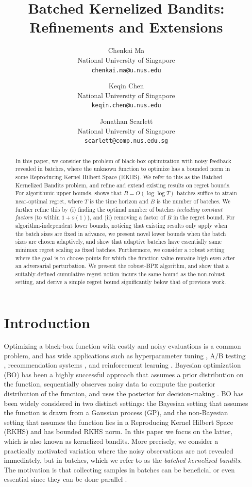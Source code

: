 \documentclass[10pt]{article}
\title{Batched Kernelized Bandits: Refinements and Extensions}
\author{
Chenkai Ma \\
National University of Singapore \\
\texttt{chenkai.ma@u.nus.edu}
\and
Keqin Chen \\
National University of Singapore \\
\texttt{keqin.chen@u.nus.edu}
\and
Jonathan Scarlett \\
National University of Singapore \\
\texttt{scarlett@comp.nus.edu.sg}
}
\date{}
\begin{document}
\maketitle

\begin{abstract}
    In this paper, we consider the problem of black-box optimization with noisy feedback revealed in batches, where the unknown function to optimize has a bounded norm in some Reproducing Kernel Hilbert Space (RKHS).
    We refer to this as the Batched Kernelized Bandits problem, and refine and extend existing results on regret bounds. 
    For algorithmic upper bounds, \citep{Li22} shows that $B=O(\log\log T)$ batches suffice to attain near-optimal regret, where $T$ is the time horizon and $B$ is the number of batches. We further refine this by (i) finding the optimal number of batches \emph{including constant factors} (to within $1+o(1)$), and (ii) removing a factor of $B$ in the regret bound.  
    For algorithm-independent lower bounds, noticing that existing results only apply when the batch sizes are fixed in advance, we present novel lower bounds when the batch sizes are chosen adaptively, and show that adaptive batches have essentially same minimax regret scaling as fixed batches.
    Furthermore, we consider a robust setting where the goal is to choose points for which the function value remains high even after an adversarial perturbation.  We present the robust-BPE algorithm, and show that a suitably-defined cumulative regret notion incurs the same bound as the non-robust setting, and derive a simple regret bound significantly below that of previous work.
\end{abstract}

\section{Introduction}
Optimizing a black-box function with costly and noisy evaluations is a common problem, and has wide applications such as hyperparameter tuning \citep{Snoek12}, A/B testing \citep{Kohavi09}, recommendation systems \citep{Li10}, and reinforcement learning \citep{Lizotte07}. 
Bayesian optimization (BO) has been a highly successful approach that assumes a prior distribution on the function, sequentially observes noisy data to compute the posterior distribution of the function, and uses the posterior for decision-making \citep{Garnett23}.
BO has been widely considered in two distinct settings: the Bayesian setting that assumes the function is drawn from a Gaussian process (GP), and the non-Bayesian setting that assumes the function lies in a Reproducing Kernel Hilbert Space (RKHS) and has bounded RKHS norm. In this paper we focus on the latter, which is also known as kernelized bandits. More precisely, we consider a practically motivated variation where the noisy observations are not revealed immediately, but in batches, which we refer to as the \emph{batched kernelized bandits}.  The motivation is that collecting samples in batches can be beneficial or even essential since they can be done parallel \citep{Kittur08, Bertsimas07}.
\end{document}
